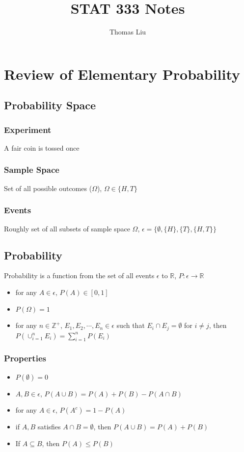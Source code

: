 \documentclass[11pt]{article}
\title{STAT 333 Notes}
\author{Thomas Liu}
\newcommand{\R}{{\mathbb{R}}}
\newcommand{\Z}{{\mathbb{Z}}}
\newcommand{\ds}{\displaystyle}
\begin{document}
\maketitle
\tableofcontents

\newpage
\section{Review of Elementary Probability}
\subsection{Probability Space}
\subsubsection*{Experiment}
A fair coin is tossed once 
\subsubsection*{Sample Space}
Set of all possible outcomes ($\Omega$), $\Omega\in\{H,T\}$
\subsubsection*{Events}
Roughly set of all subsets of sample space $\Omega$, $\epsilon = \{\emptyset, \{H\}, \{T\}, \{H,T\}\}$
\subsection{Probability}
Probability is a function from the set of all events $\epsilon$ to $\R$, $P:\epsilon\to\R$
\begin{itemize}
    \item for any $A\in\epsilon$, $P(A)\in[0,1]$
    \item $P(\Omega)=1$
    \item for any $n\in\Z^+$, $E_1,E_2,\cdots,E_n\in\epsilon$ such that $E_i\cap E_j=\emptyset$ for $i\neq j$, then $\ds P(\cup_{i=1}^n E_i)=\sum_{i=1}^n P(E_i)$
\end{itemize}
\subsubsection*{Properties}
\begin{itemize}
    \item $P(\emptyset)=0$
    \item $A,B\in\epsilon$, $P(A\cup B)=P(A)+P(B)-P(A\cap B)$
    \item for any $A\in\epsilon$, $P(A^c)=1-P(A)$
    \item if $A,B$ satisfies $A\cap B=\emptyset$, then $P(A\cup B)=P(A)+P(B)$
    \item If $A\subseteq B$, then $P(A)\leq P(B)$
\end{itemize}
\end{document}
